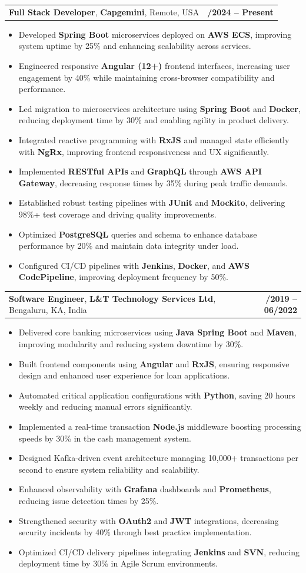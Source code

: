 \documentclass[letterpaper,11pt]{article}
\makeatletter
\newcommand{\resumeItem}[1]{
  \item\footnotesize{
    {#1 \vspace{-2pt}}
  }
}
\newcommand{\resumeSubheading}[4]{
  \vspace{-2pt}\item
    \begin{tabular*}{1.0\textwidth}[t]{l@{\extracolsep{\fill}}r}
      \textbf{\fontsize{10pt}{14pt}\selectfont #3}, \textbf{\fontsize{10pt}{14pt}\selectfont #1}, \fontsize{10pt}{14pt}\selectfont #4 & \textbf{\fontsize{10pt}{14pt}\selectfont #2} \\
    \end{tabular*}\vspace{-7pt}
}
\newcommand{\resumeItemListStart}{\begin{itemize}[leftmargin=*]}
\newcommand{\resumeItemListEnd}{\end{itemize}\vspace{-5pt}}
\makeatother
\begin{document}
    \resumeSubheading
        {Capgemini}{01/2024 -- Present}
        {Full Stack Developer}{Remote, USA}
      \resumeItemListStart
        \resumeItem{Developed \textbf{Spring Boot} microservices deployed on \textbf{AWS ECS}, improving system uptime by 25\% and enhancing scalability across services.}
        \resumeItem{Engineered responsive \textbf{Angular (12+)} frontend interfaces, increasing user engagement by 40\% while maintaining cross-browser compatibility and performance.}
        \resumeItem{Led migration to microservices architecture using \textbf{Spring Boot} and \textbf{Docker}, reducing deployment time by 30\% and enabling agility in product delivery.}
        \resumeItem{Integrated reactive programming with \textbf{RxJS} and managed state efficiently with \textbf{NgRx}, improving frontend responsiveness and UX significantly.}
        \resumeItem{Implemented \textbf{RESTful APIs} and \textbf{GraphQL} through \textbf{AWS API Gateway}, decreasing response times by 35\% during peak traffic demands.}
        \resumeItem{Established robust testing pipelines with \textbf{JUnit} and \textbf{Mockito}, delivering 98\%+ test coverage and driving quality improvements.}
        \resumeItem{Optimized \textbf{PostgreSQL} queries and schema to enhance database performance by 20\% and maintain data integrity under load.}
        \resumeItem{Configured CI/CD pipelines with \textbf{Jenkins}, \textbf{Docker}, and \textbf{AWS CodePipeline}, improving deployment frequency by 50\%.}
      \resumeItemListEnd

    \resumeSubheading
        {L\&T Technology Services Ltd}{08/2019 -- 06/2022}
        {Software Engineer}{Bengaluru, KA, India}
      \resumeItemListStart
        \resumeItem{Delivered core banking microservices using \textbf{Java Spring Boot} and \textbf{Maven}, improving modularity and reducing system downtime by 30\%.}
        \resumeItem{Built frontend components using \textbf{Angular} and \textbf{RxJS}, ensuring responsive design and enhanced user experience for loan applications.}
        \resumeItem{Automated critical application configurations with \textbf{Python}, saving 20 hours weekly and reducing manual errors significantly.}
        \resumeItem{Implemented a real-time transaction \textbf{Node.js} middleware boosting processing speeds by 30\% in the cash management system.}
        \resumeItem{Designed Kafka-driven event architecture managing 10,000+ transactions per second to ensure system reliability and scalability.}
        \resumeItem{Enhanced observability with \textbf{Grafana} dashboards and \textbf{Prometheus}, reducing issue detection times by 25\%.}
        \resumeItem{Strengthened security with \textbf{OAuth2} and \textbf{JWT} integrations, decreasing security incidents by 40\% through best practice implementation.}
        \resumeItem{Optimized CI/CD delivery pipelines integrating \textbf{Jenkins} and \textbf{SVN}, reducing deployment time by 30\% in Agile Scrum environments.}
      \resumeItemListEnd
\end{document}
